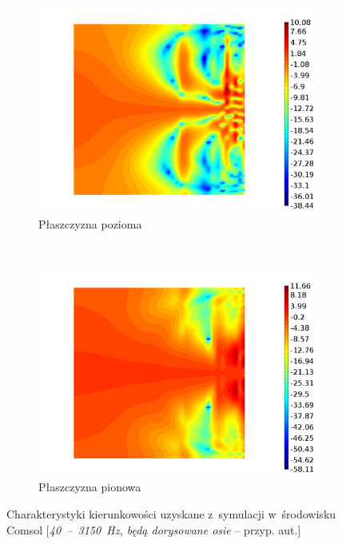 \documentclass[12pt]{oska}
\newcommand{\range}[2]{\num{#1}~--~\num{#2}}
\begin{document}
		
		\begin{figure}[!ht]
			\centering
			\begin{subfigure}[b]{.49\textwidth}
				\includegraphics[width=\textwidth]{horyzontalna_axis_off.png}
				\caption{Płaszczyzna pozioma}
				\label{r:C_poziom}
			\end{subfigure}
			~
			\begin{subfigure}[b]{.49\textwidth}
				\includegraphics[width=\textwidth]{vertykalna_axis_off.png}
				\caption{Płaszczyzna pionowa}
				\label{r:C_pion}
			\end{subfigure}
			
			\caption{Charakterystyki kierunkowości uzyskane z~symulacji w~środowisku Comsol [\textit{\range{40}{3150}~\si{\hertz}, będą dorysowane osie} -- przyp. aut.]}
			\label{r:C_kierunk}
		\end{figure}
		
\end{document}
